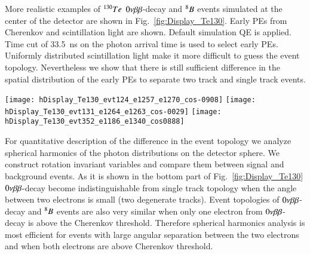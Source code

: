 More realistic examples of $^{130}Te$ $0\nu\beta\beta$-decay and $^{8}B$ events simulated at the center of the detector are shown in Fig.~\ref{fig:Display_Te130}. Early PEs from Cherenkov and scintillation light are shown. Default simulation QE is applied. Time cut of 33.5~ns on the photon arrival time is used to select early PEs. Uniformly distributed scintillation light make it more difficult to guess the event topology. Nevertheless we show that there is still sufficient difference in the spatial distribution of the early PEs to separate two track and single track events.

\begin{figure*}[h]
  \centering
  \texttt{[image: hDisplay\_Te130\_evt124\_e1257\_e1270\_cos-0908]}
  \texttt{[image: hDisplay\_Te130\_evt131\_e1264\_e1263\_cos-0029]}
  \texttt{[image: hDisplay\_Te130\_evt352\_e1186\_e1340\_cos0888]}
  \caption{Examples of PEs position on the detector sphere after time
    cut of 33.5ns. PEs from Cherenkov (\emph{red}) and scintillation
    light (\emph{blue}) are compared. \emph{Top left:} $^{130}$Te
    0{\nbb} decay back-to-back electrons: $E_1$=1.257~MeV,
    $E_2$=1.270~MeV, cos($\theta$)=-0.908. \emph{Top right:}
    $^{130}$Te 0{\nbb} decay electrons at $\sim$90$^{\circ}$:
    $E_1$=1.264~MeV, $E_2$=1.263~MeV,
    cos($\theta$)=-0.029. \emph{Bottom left:} $^{130}$Te 0{\nbb} decay
    electrons at $\sim$0$^{\circ}$: $E_1$=1.186~MeV, $E_2$=1.340~MeV,
    cos($\theta$)=0.888. \emph{Bottom right:} 2.529~MeV single
    electron. Events are simulated at the center of the
    detector. Default QE is applied.}
\label{fig:Display_Te130}
\end{figure*}


For quantitative description of the difference in the event topology we analyze spherical harmonics of the photon distributions on the detector sphere. We construct rotation invariant variables and compare them between signal and background events. As it is shown in the bottom part of Fig.~\ref{fig:Display_Te130} $0\nu\beta\beta$-decay become indistinguishable from single track topology when the angle between two electrons is small (two degenerate tracks). Event topologies of $0\nu\beta\beta$-decay and $^{8}B$ events are also very similar when only one electron from $0\nu\beta\beta$-decay is above the Cherenkov threshold. Therefore spherical harmonics analysis is most efficient for events with large angular separation between the two electrons and when both electrons are above Cherenkov threshold. 

